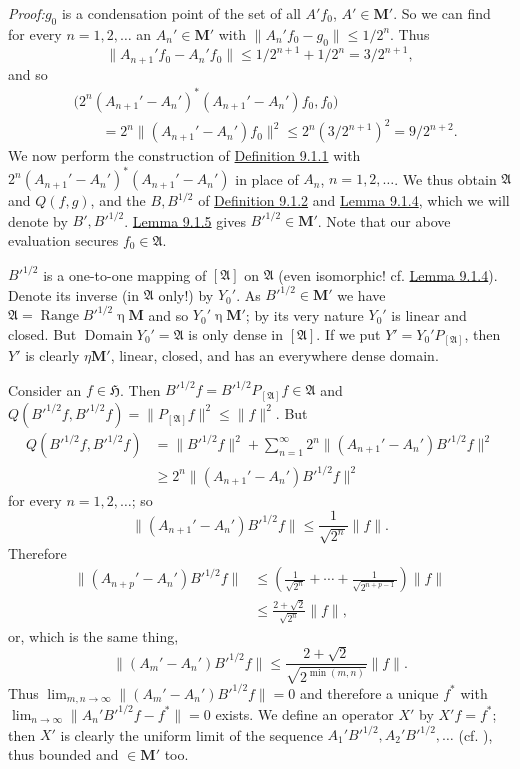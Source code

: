 \documentclass[12pt,b5paper,twoside]{article}
\newcommand{\Hspace}{\mathfrak H}
\newcommand{\M}{\mathbf M}
\newcommand{\Proof}{\par\noindent\textit{Proof:}\enspace}
\newcommand{\defref}[1]{\hyperref[def:#1]{Definition #1}}
\newcommand{\lemref}[1]{\hyperref[lem:#1]{Lemma #1}}
\begin{document}
\Proof $g_0$ is a condensation point of the set of all $A'f_0$,
$A'\in\M'$. So we can find for every $n=1,2,\ldots$ an $A_n'\in\M'$ with
$\lVert A_n'f_0-g_0\rVert\leq 1/2^n$. Thus
\[
 \lVert A_{n+1}'f_0-A_n'f_0\rVert
 \leq 1/2^{n+1}+1/2^n=3/2^{n+1},
\]
and so
\begin{align*}
 &\bigl(2^n(A_{n+1}'-A_n')^*(A_{n+1}'-A_n')f_0,f_0\bigr)\\
 &\qquad=2^n\lVert(A_{n+1}'-A_n')f_0\rVert^2
 \leq 2^n(3/2^{n+1})^2=9/2^{n+2}.
\end{align*}
We now perform the construction of \defref{9.1.1} with
$2^n(A_{n+1}'-A_n')^*(A_{n+1}'-A_n')$ in place of $A_n$,
$n=1,2,\ldots$. We thus obtain $\mathfrak A$ and $Q(f,g)$, and the
$B,B^{1/2}$ of \defref{9.1.2} and \lemref{9.1.4}, which we will denote by
$B',B'^{1/2}$. \lemref{9.1.5} gives $B'^{1/2}\in\M'$. Note that our
above evaluation secures $f_0\in\mathfrak A$.

$B'^{1/2}$ is a one-to-one mapping of $[\mathfrak A]$ on $\mathfrak A$
(even isomorphic! cf. \lemref{9.1.4}). Denote its inverse (in
$\mathfrak A$ only!) by $Y_0'$. As $B'^{1/2}\in\M'$ we have
$\mathfrak A=\operatorname{Range}B'^{1/2}\mathbin\eta\M$ and so
$Y_0'\mathbin\eta\M'$; by its very nature $Y_0'$ is linear and closed. But
$\operatorname{Domain}Y_0'=\mathfrak A$ is only dense in $[\mathfrak A]$.
If we put $Y'=Y_0'P_{[\mathfrak A]}$, then $Y'$ is clearly
$\mathbin\eta\M'$, linear, closed, and has an everywhere dense domain.

Consider an $f\in\Hspace$. Then
$B'^{1/2}f=B'^{1/2}P_{[\mathfrak A]}f\in\mathfrak A$ and
$Q(B'^{1/2}f,B'^{1/2}f)=\lVert P_{[\mathfrak A]}f\rVert^2\leq\lVert f\rVert^2$.
But
\begin{align*}
 Q(B'^{1/2}f,B'^{1/2}f)
 &=\lVert B'^{1/2}f\rVert^2
   +\sum_{n=1}^{\infty}2^n
     \lVert(A_{n+1}'-A_n')B'^{1/2}f\rVert^2\\
 &\geq 2^n\lVert(A_{n+1}'-A_n')B'^{1/2}f\rVert^2
\end{align*}
for every $n=1,2,\ldots$; so
\[
 \lVert(A_{n+1}'-A_n')B'^{1/2}f\rVert
 \leq\frac1{\sqrt{2^n}}\lVert f\rVert.
\]
Therefore
\begin{align*}
 \lVert(A_{n+p}'-A_n')B'^{1/2}f\rVert
 &\leq\left(\frac1{\sqrt{2^n}}+\cdots+
              \frac1{\sqrt{2^{n+p-1}}}\right)\lVert f\rVert\\
 &\leq\frac{2+\sqrt2}{\sqrt{2^n}}\lVert f\rVert,
\end{align*}
or, which is the same thing,
\[
 \lVert(A_m'-A_n')B'^{1/2}f\rVert
 \leq\frac{2+\sqrt2}{\sqrt{2^{\min(m,n)}}}\lVert f\rVert.
\]
Thus $\lim_{m,n\to\infty}\lVert(A_m'-A_n')B'^{1/2}f\rVert=0$ and
therefore a unique $f^*$ with
$\lim_{n\to\infty}\lVert A_n'B'^{1/2}f-f^*\rVert=0$ exists. We define an
operator $X'$ by $X'f=f^*$; then $X'$ is clearly the uniform limit of the
sequence $A_1'B'^{1/2},A_2'B'^{1/2},\ldots$ (cf.
\cite[p.~384]{ref18}), thus bounded and $\in\M'$ too.
\end{document}
